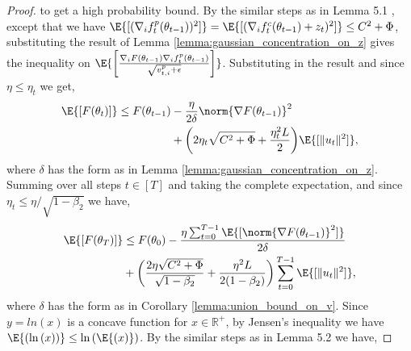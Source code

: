 \documentclass[letterpaper]{article} %
\begin{document}
\begin{proof}
    to get a high probability bound.
    By the similar steps as in Lemma 5.1 \citep{défossez2022simple}, except that we have $\E{[(\nabla_i f_t^{p}(\theta_{t-1}))^2]} = \E{[(\nabla_i f_t^{c}(\theta_{t-1}) + z_t)^2]} \leq C^2  + \Phi$, substituting the result of Lemma \ref{lemma:gaussian_concentration_on_z} gives the inequality on $\E{\bigg[\frac{\nabla_i F(\theta_{t-1}) \nabla_i f_t^{p}(\theta_{t-1})}{\sqrt{v_{t, i}^{p} + \epsilon }}\bigg]}$.
    Substituting in the result and since $\eta \leq \eta_t$ we get,
    \begin{align*}
        \E{[F(\theta_t)]} \leq F(\theta_{t-1}) &- \frac{\eta}{2\delta} \norm{\nabla F(\theta_{t-1})}^2 \\ &+ \bigg(2\eta_t \sqrt{C^2+\Phi} + \frac{\eta_t^2 L}{2}\bigg) \E{[\lVert u_{t} \rVert^2]},
    \end{align*}
    where $\delta$ has the form as in Lemma \ref{lemma:gaussian_concentration_on_z}.
    Summing over all steps $t \in [T]$ and taking the complete expectation, and since $\eta_t \leq \eta / \sqrt{1-\beta_2}$ we have,
    \begin{align*}
        \E{[F(\theta_T)]} &\leq F(\theta_0) - \frac{\eta \sum_{t=0}^{T-1} \E{[\norm{\nabla F(\theta_{t-1})}^2]}}{2\delta} \\ &+ \bigg(\frac{2\eta \sqrt{C^2+\Phi}}{\sqrt{1-\beta_2}} + \frac{\eta^2 L}{2(1-\beta_2)}\bigg) \sum_{t=0}^{T-1} \E{[\lVert u_{t} \rVert^2]},
    \end{align*}
    where $\delta$ has the form as in Corollary \ref{lemma:union_bound_on_v}.
    Since $y=ln(x)$ is a concave function for $x\in \mathbb{R}^{+}$, by Jensen's inequality we have $\E{(\ln{(x)})} \leq \ln{(\E{(x)})}$. By the similar steps as in Lemma 5.2 \citep{défossez2022simple} we have,

\end{proof}
\end{document}
